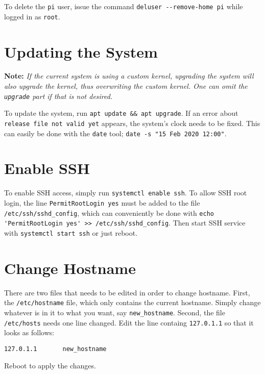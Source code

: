 To delete the \lstinline{pi} user, issue the command \lstinline{deluser --remove-home pi} while logged in as \lstinline{root}.


\section{Updating the System} \label{update_system}

\textbf{Note:} \textit{If the current system is using a custom kernel, upgrading the system will also upgrade the kernel, thus overwriting the custom kernel. One can omit the \lstinline{upgrade} part if that is not desired.}

To update the system, run \lstinline{apt update && apt upgrade}. If an error about \lstinline{release file not valid yet} appears, the system's clock needs to be fixed. This can easily be done with the \lstinline{date} tool; \lstinline{date -s "15 Feb 2020 12:00"}.


\section{Enable SSH} \label{enable_ssh}

To enable SSH access, simply run \lstinline{systemctl enable ssh}. To allow SSH root login, the line \lstinline{PermitRootLogin yes} must be added to the file \lstinline{/etc/ssh/sshd_config}, which can conveniently be done with \lstinline{echo 'PermitRootLogin yes' >> /etc/ssh/sshd_config}. Then start SSH service with \lstinline{systemctl start ssh} or just reboot.


\section{Change Hostname} \label{change_hostname}

There are two files that needs to be edited in order to change hostname. First, the \lstinline{/etc/hostname} file, which only contains the current hostname. Simply change whatever is in it to what you want, say \lstinline{new_hostname}. Second, the file \lstinline{/etc/hosts} needs one line changed. Edit the line containg \lstinline{127.0.1.1} so that it looks as follows:

\begin{lstlisting}
127.0.1.1       new_hostname
\end{lstlisting}

Reboot to apply the changes.


